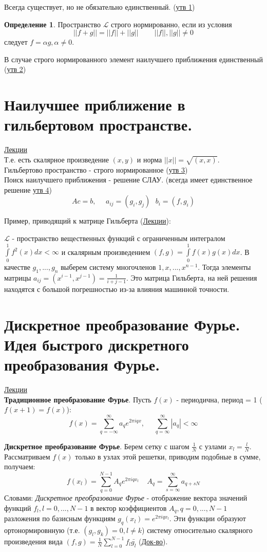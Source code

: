 \documentclass[specialist, subf, href, colorlinks=true, 12pt, times, mtpro, final]{disser}
\theoremstyle{definition}
\newtheorem{defn}{Определение}[section]
\begin{document}
	Всегда существует, но не обязательно единственный. (\hyperlink {lects.28}{утв 1})
	
	\begin{defn}  
		Пространство $\mathcal{L}$ строго нормированно, если из условия
		$$
			||f+g|| = ||f||+||g|| \ \ \ \ \ \ \ \ \ \ ||f||,||g|| \ne 0
		$$
		следует $f = \alpha g, \alpha \ne 0$.
	\end{defn}

	В случае строго нормированного элемент наилучшего приближения единственный (\hyperlink {lects.29}{утв 2})

\section {Наилучшее приближение в гильбертовом пространстве.}
	\hyperlink {lects.29}{Лекции}\\
	Т.е. есть скалярное произведение $(x,y)$ и норма $||x||=\sqrt{(x,x)}$. \\
	Гильбертово пространство - строго нормированное (\hyperlink {lects.29}{утв 3}) \\
	
	Поиск наилучшего приближения - решение СЛАУ. (всегда имеет единственное решение \hyperlink {lects.30}{утв 4})
	$$
		Ac = b, \ \ \ \ \ \ a_{ij} = (g_i, g_j) \ \ \ b_i = (f, g_i)
	$$
	
	Пример, приводящий к матрице Гильберта (\hyperlink {lects.31}{Лекции}):
	
	$\mathcal{L}$ - пространство вещественных функций с ограниченным интегралом $\int\limits_0^1 f^2(x)dx < \infty $ и скалярным произведением $(f,g) = \int\limits_0^1 f(x)g(x)dx$. В качестве $g_1, ..., g_n$ выберем систему многочленов $1, x, ..., x^{n-1}$. Тогда элементы матрицы $a_{ij} = (x^{i-1},x^{j-1}) = \frac{1}{i+j-1}$. Это матрица Гильберта, на ней решения находятся с большой погрешностью из-за влияния машинной точности. 

\section {Дискретное преобразование Фурье. Идея быстрого дискретного преобразования Фурье.}
	\hyperlink {lects.32}{Лекции}\\
	\textbf{Традиционное преобразование Фурье}. Пусть $f(x)$ - периодична, период = 1 ($f(x+1) = f(x)$):
	$$
		f(x) = \sum\limits_{q = -\infty}^{\infty} a_q e^{2\pi i qx},  \ \ \  \ \ \ \sum\limits_{q = \infty}^{\infty}|a_q| < \infty
	$$
	
	\textbf{Дискретное преобразование Фурье}. Берем сетку с шагом $\frac{1}{N}$ с узлами $x_l = \frac{l}{N}$. Рассматриваем $f(x)$ только в узлах этой решетки, приводим подобные в сумме, получаем:
	$$
		f(x_l) = \sum\limits_{q = 0}^{N-1} A_q e^{2\pi i qx_l} \ \ \ \ \ A_q = \sum\limits_{s = \infty}^{\infty} a_{q+sN}
	$$
	Словами: \textit{Дискретное преобразование Фурье} - отображение вектора значений функций $f_l, l = 0, ..., N-1$ в вектор коэффициентов $A_q, q = 0, ..., N-1$ разложения по базисным функциям $g_q(x_l) = e^{2\pi i qx_l}$. Эти функции образуют ортонормировнную (т.е. $(g_l,g_k) = 0, l \ne k$) систему относительно скалярного произведения вида $(f,g) = \frac{1}{N}\sum\limits_{l = 0}^{N-1}f_l \bar{g_l}$ (\hyperlink {lects.32}{Док-во}). 
	
\end{document}
